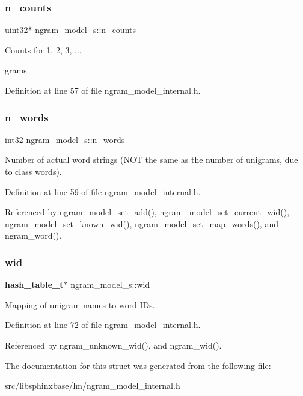 \subsubsection{n\+\_\+counts}
{\footnotesize\ttfamily uint32$\ast$ ngram\+\_\+model\+\_\+s\+::n\+\_\+counts}



Counts for 1, 2, 3, ... 

grams 

Definition at line 57 of file ngram\+\_\+model\+\_\+internal.\+h.

\mbox{\label{structngram__model__s_a74f85927ef0d5513a1e6c02d13864be3}} 
\subsubsection{n\+\_\+words}
{\footnotesize\ttfamily int32 ngram\+\_\+model\+\_\+s\+::n\+\_\+words}



Number of actual word strings (N\+OT the same as the number of unigrams, due to class words). 



Definition at line 59 of file ngram\+\_\+model\+\_\+internal.\+h.



Referenced by ngram\+\_\+model\+\_\+set\+\_\+add(), ngram\+\_\+model\+\_\+set\+\_\+current\+\_\+wid(), ngram\+\_\+model\+\_\+set\+\_\+known\+\_\+wid(), ngram\+\_\+model\+\_\+set\+\_\+map\+\_\+words(), and ngram\+\_\+word().

\mbox{\label{structngram__model__s_a75567419a8002ef6e916c81f5d9ee9ed}} 
\subsubsection{wid}
{\footnotesize\ttfamily \textbf{ hash\+\_\+table\+\_\+t}$\ast$ ngram\+\_\+model\+\_\+s\+::wid}



Mapping of unigram names to word I\+Ds. 



Definition at line 72 of file ngram\+\_\+model\+\_\+internal.\+h.



Referenced by ngram\+\_\+unknown\+\_\+wid(), and ngram\+\_\+wid().



The documentation for this struct was generated from the following file\+:\begin{DoxyCompactItemize}
\item 
src/libsphinxbase/lm/ngram\+\_\+model\+\_\+internal.\+h\end{DoxyCompactItemize}

